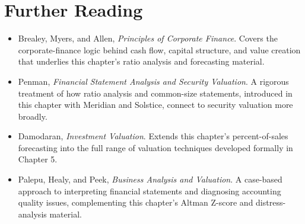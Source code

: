 \documentclass[../ai_in_finance]{subfiles}
\begin{document}
\section{Further Reading}

\begin{itemize}
    \item Brealey, Myers, and Allen, \emph{Principles of Corporate Finance}. Covers the corporate-finance logic behind cash flow, capital structure, and value creation that underlies this chapter's ratio analysis and forecasting material.
    \item Penman, \emph{Financial Statement Analysis and Security Valuation}. A rigorous treatment of how ratio analysis and common-size statements, introduced in this chapter with Meridian and Solstice, connect to security valuation more broadly.
    \item Damodaran, \emph{Investment Valuation}. Extends this chapter's percent-of-sales forecasting into the full range of valuation techniques developed formally in Chapter 5.
    \item Palepu, Healy, and Peek, \emph{Business Analysis and Valuation}. A case-based approach to interpreting financial statements and diagnosing accounting quality issues, complementing this chapter's Altman Z-score and distress-analysis material.
\end{itemize}
\end{document}

